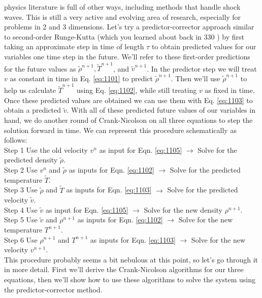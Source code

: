 \documentclass{book}
\theoremstyle{plain}
\theoremstyle{definition}
\numberwithin{exm}{chapter}
\theoremstyle{remark}
\theoremstyle{summary}
\theoremstyle{overview}
\begin{document}
physics literature is full of other ways, including methods that handle shock waves.
This is still a very active and evolving area of research, especially for problems in
2 and 3 dimensions.
Let\rq s try a predictor-corrector approach similar to second-order Runge-Kutta (which you learned about back in 330 ) by first taking an approximate step in time of length $\tau$ to obtain predicted values for our variables one time step in the future. We'll refer to these first-order predictions for the future values as $\tilde{\rho}^{n+1}, \tilde{T}^{n+1}$, and $\tilde{v}^{n+1}$. In the predictor step we will treat $v$ as constant in time in Eq. \eqref{eq:1101} to predict $\tilde{\rho}^{n+1}$. Then we'll use $\tilde{\rho}^{n+1}$ to help us calculate $\tilde{T}^{n+1}$ using Eq. \eqref{eq:1102}, while still treating $v$ as fixed in time. Once these predicted values are obtained we can use them with Eq. \eqref{eq:1103} to obtain a predicted $\tilde{v}$. With all of these predicted future values of our variables in hand, we do another round of Crank-Nicolson on all three equations to step the solution forward in time. We can represent this procedure schematically as follows:\\
Step 1 Use the old velocity $v^{n}$ as input for Eqn. \eqref{eq:1105} $\rightarrow$ Solve for the predicted density $\tilde{\rho}$.\\
Step 2 Use $v^{n}$ and $\tilde{\rho}$ as inputs for Eqn. \eqref{eq:1102} $\rightarrow$ Solve for the predicted temperature $\tilde{T}$.\\
Step 3 Use $\tilde{\rho}$ and $\tilde{T}$ as inputs for Eqn. \eqref{eq:1103} $\rightarrow$ Solve for the predicted velocity $\tilde{v}$.\\
Step 4 Use $\tilde{v}$ as input for Eqn. \eqref{eq:1105} $\rightarrow$ Solve for the new density $\rho^{n+1}$.\\
Step 5 Use $\tilde{v}$ and $\rho^{n+1}$ as inputs for Eqn. \eqref{eq:1102} $\rightarrow$ Solve for the new temperature $T^{n+1}$.\\
Step 6 Use $\rho^{n+1}$ and $T^{n+1}$ as inputs for Eqn. \eqref{eq:1103} $\rightarrow$ Solve for the new velocity $v^{n+1}$.\\

This procedure probably seems a bit nebulous at this point, so let\rq s go through it in more detail. First we\rq ll derive the Crank-Nicolson algorithms for our three equations, then we\rq ll show how to use these algorithms to solve the system using the predictor-corrector method.
\end{document}

